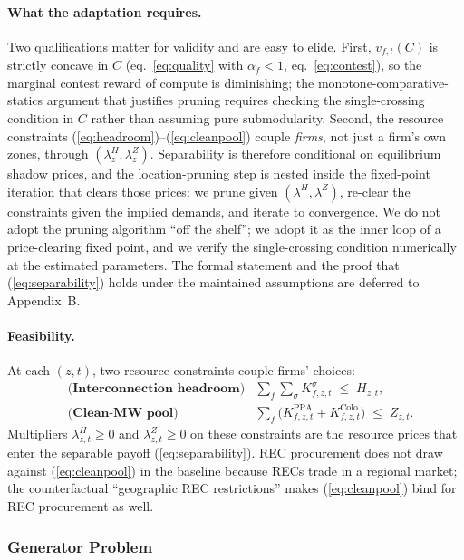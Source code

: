 \documentclass[12pt,letterpaper]{article}
\begin{document}
\paragraph{What the adaptation requires.} Two qualifications matter for
validity and are easy to elide. First, $v_{f,t}(C)$ is strictly concave in $C$
(eq.~\ref{eq:quality} with $\alpha_f<1$, eq.~\ref{eq:contest}), so the marginal
contest reward of compute is diminishing; the monotone-comparative-statics
argument that justifies pruning requires checking the single-crossing condition
in $C$ rather than assuming pure submodularity. Second, the resource
constraints (\ref{eq:headroom})--(\ref{eq:cleanpool}) couple \emph{firms}, not
just a firm's own zones, through $(\lambda^H_z,\lambda^Z_z)$. Separability is
therefore conditional on equilibrium shadow prices, and the location-pruning
step is nested inside the fixed-point iteration that clears those prices: we
prune given $(\lambda^H,\lambda^Z)$, re-clear the constraints given the implied
demands, and iterate to convergence. We do not adopt the pruning algorithm
``off the shelf''; we adopt it as the inner loop of a price-clearing
fixed point, and we verify the single-crossing condition numerically at the
estimated parameters. The formal statement and the proof that
(\ref{eq:separability}) holds under the maintained assumptions are deferred to
Appendix~B.

\paragraph{Feasibility.}
\label{sec:feasibility}
At each $(z,t)$, two resource constraints couple
firms' choices:
\begin{align}
\label{eq:headroom}
&\textbf{(Interconnection headroom)} & \sum_f \sum_\sigma K_{f,z,t}^\sigma
\;\leq\; H_{z,t}, \\
\label{eq:cleanpool}
&\textbf{(Clean-MW pool)} & \sum_f \big(K_{f,z,t}^{\text{PPA}} + K_{f,z,t}^{\text{Colo}}\big)
\;\leq\; Z_{z,t}.
\end{align}
Multipliers $\lambda^H_{z,t} \geq 0$ and $\lambda^Z_{z,t} \geq 0$ on these
constraints are the resource prices that enter the separable payoff
(\ref{eq:separability}). REC procurement does not draw against
(\ref{eq:cleanpool}) in the baseline because RECs trade in a regional
market; the counterfactual ``geographic REC restrictions'' makes
(\ref{eq:cleanpool}) bind for REC procurement as well.

\subsubsection{Generator Problem}
\label{sec:gen_lr}
\end{document}
